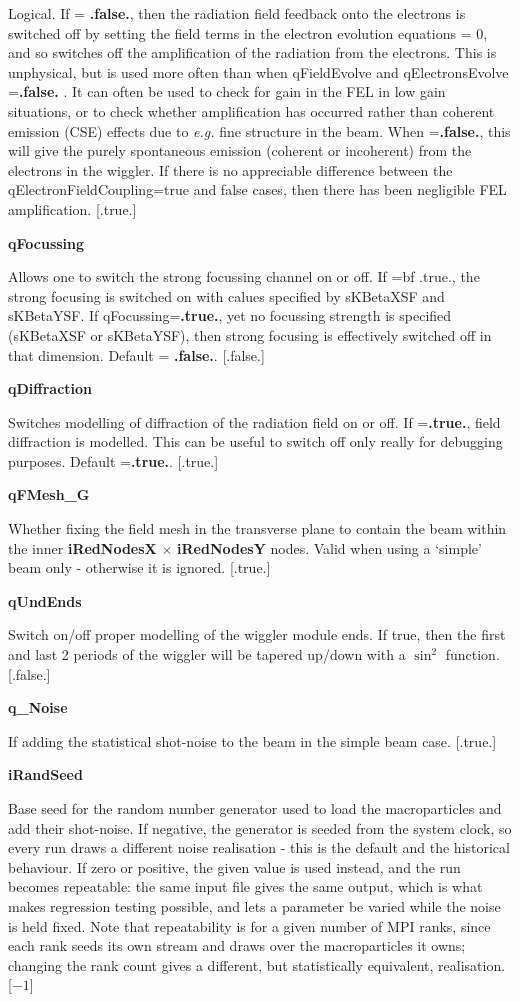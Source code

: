 \documentclass[12pt]{article}%
\begin{document}
Logical. If = {\bf .false.}, then the radiation field feedback onto the electrons is switched off by setting the field terms in the electron evolution equations = 0, and so switches off the amplification of the radiation from the electrons. This is unphysical, but is used more often than when qFieldEvolve and qElectronsEvolve ={\bf .false.} . It can often be used to check for gain in the FEL in low gain situations, or to check whether amplification has occurred rather than coherent emission (CSE) effects due to \textit{e.g.} fine structure in the beam. When ={\bf .false.}, this will give the purely spontaneous emission (coherent or incoherent) from the electrons in the wiggler. If there is no appreciable difference between the qElectronFieldCoupling=true and false cases, then there has been negligible FEL amplification. [.true.]

{\bf qFocussing}

Allows one to switch the strong focussing channel on or off. If ={bf .true.}, the strong focusing is switched on with calues specified by sKBetaXSF and sKBetaYSF. If qFocussing={\bf .true.}, yet no focussing strength is specified (sKBetaXSF or sKBetaYSF), then strong focusing is effectively switched off in that dimension. Default = {\bf .false.}. [.false.]

{\bf qDiffraction}

Switches modelling of diffraction of the radiation field on or off. If ={\bf .true.}, field diffraction is modelled. This can be useful to switch off only really for debugging purposes. Default ={\bf .true.}. [.true.]

{\bf qFMesh\_G}

Whether fixing the field mesh in the transverse plane to contain the beam within the inner {\bf iRedNodesX} $\times$ {\bf iRedNodesY} nodes. Valid when using a `simple' beam only - otherwise it is ignored. [.true.]

{\bf qUndEnds}

Switch on/off proper modelling of the wiggler module ends. If true, then the first and last 2 periods of the wiggler will be tapered up/down with a $\sin^2$ function. [.false.]

{\bf q\_Noise}

If adding the statistical shot-noise to the beam in the simple beam case. [.true.]

{\bf iRandSeed}

Base seed for the random number generator used to load the macroparticles and add their shot-noise. If negative, the generator is seeded from the system clock, so every run draws a different noise realisation - this is the default and the historical behaviour. If zero or positive, the given value is used instead, and the run becomes repeatable: the same input file gives the same output, which is what makes regression testing possible, and lets a parameter be varied while the noise is held fixed. Note that repeatability is for a given number of MPI ranks, since each rank seeds its own stream and draws over the macroparticles it owns; changing the rank count gives a different, but statistically equivalent, realisation. [$-1$]
\end{document}
